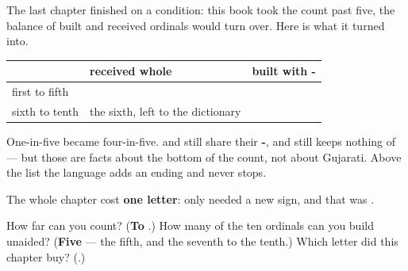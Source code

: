 \begin{grammarlens}[title={What you've built this chapter, in one number}]
The last chapter finished on a condition: \textbf{} this book took the count past five, \textbf{} the balance of built and received ordinals would turn over. Here is what it turned into.

\noindent
\begin{tabularx}{\linewidth}{@{}>{\raggedright\arraybackslash}X>{\raggedright\arraybackslash}X>{\raggedright\arraybackslash}X@{}}
\toprule
\textbf{} & \textbf{received whole} & \textbf{built with \textbf{-\gu{મું}}} \\
\midrule
first to fifth & \textbf{\gu{પહેલું} \gu{બીજું} \gu{ત્રીજું} \gu{ચોથું}} & \textbf{\gu{પાંચમું}} \\
sixth to tenth & the sixth, left to the dictionary & \textbf{\gu{સાતમું} \gu{આઠમું} \gu{નવમું} \gu{દસમું}} \\
\bottomrule
\end{tabularx}

One-in-five became four-in-five. \textbf{} and \textbf{} still share their \textbf{-}, and \textbf{} still keeps nothing of \textbf{} — but those are facts about the bottom of the count, not about Gujarati. Above the list the language adds an ending and never stops.

The whole chapter cost \textbf{one letter}: only \textbf{} needed a new sign, and that was \textbf{}.
\end{grammarlens}

\begin{tcolorbox}[breakable,colback=teal!4,colframe=teal!35!black,title={Before you move on}]
How far can you count? (\textbf{To }.) How many of the ten ordinals can you build unaided? (\textbf{Five} — the fifth, and the seventh to the tenth.) Which letter did this chapter buy? (\textbf{}.)
\end{tcolorbox}
